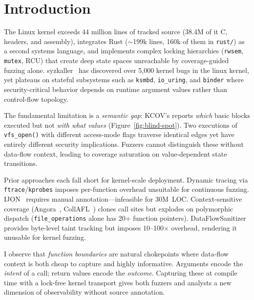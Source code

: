 \documentclass{article}
\begin{document}
\section{Introduction}\label{sec:intro}

The Linux kernel exceeds 44 million lines of tracked source (38.4M of it C,
headers, and assembly), integrates Rust ($\sim$199k lines, 160k of them in
\texttt{rust/}) as a second
systems language, and implements complex locking hierarchies
(\texttt{rwsem}, \texttt{mutex}, RCU) that create deep state spaces unreachable
by coverage-guided fuzzing alone. syzkaller~\cite{vyukov2015syzkaller} has
discovered over 5{,}000 kernel bugs in the linux kernel, yet plateaus on stateful
subsystems such as \texttt{ksmbd}, \texttt{io\_uring}, and \texttt{binder}
where security-critical behavior depends on runtime argument values rather than
control-flow topology.

The fundamental limitation is a \emph{semantic gap}: KCOV's \tracepc reports
\emph{which} basic blocks executed but not \emph{with what values}
(Figure~\ref{fig:blind-spot}). Two
executions of \texttt{vfs\_open()} with different access-mode flags traverse
identical edges yet have entirely different security implications. Fuzzers
cannot distinguish these without data-flow context, leading to coverage
saturation on value-dependent state transitions.

Prior approaches each fall short for kernel-scale deployment. Dynamic tracing
via \texttt{ftrace}/\texttt{kprobes} imposes per-function overhead unsuitable
for continuous fuzzing. IJON~\cite{aschermann2020ijon} requires manual
annotation---infeasible for 30M~LOC. Context-sensitive coverage
(Angora~\cite{chen2018angora}, CollAFL~\cite{gan2018collafl}) clones call sites
but explodes on polymorphic dispatch (\texttt{file\_operations} alone has 20+
function pointers). DataFlowSanitizer provides byte-level taint tracking but
imposes 10--100$\times$ overhead, rendering it unusable for kernel fuzzing.

I observe that \emph{function boundaries} are natural chokepoints where
data-flow context is both cheap to capture and highly informative. Arguments
encode the \emph{intent} of a call; return values encode the \emph{outcome}.
Capturing these at compile time with a lock-free kernel transport gives both
fuzzers and analysts a new dimension of observability without source annotation.
\end{document}
